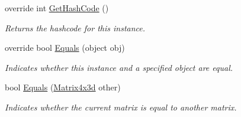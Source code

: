 \begin{DoxyCompactItemize}
override int \hyperlink{struct_open_t_k_1_1_matrix4x3d_a83922cf5625e381e429eae1a51e936cf}{Get\-Hash\-Code} ()
\begin{DoxyCompactList}\small\item\em Returns the hashcode for this instance. \end{DoxyCompactList}\item 
override bool \hyperlink{struct_open_t_k_1_1_matrix4x3d_a55b9d206e190184e1d8be634b15acf7e}{Equals} (object obj)
\begin{DoxyCompactList}\small\item\em Indicates whether this instance and a specified object are equal. \end{DoxyCompactList}\item 
bool \hyperlink{struct_open_t_k_1_1_matrix4x3d_a37bc5320745827c9946a03f767cab875}{Equals} (\hyperlink{struct_open_t_k_1_1_matrix4x3d}{Matrix4x3d} other)
\begin{DoxyCompactList}\small\item\em Indicates whether the current matrix is equal to another matrix.\end{DoxyCompactList}\end{DoxyCompactItemize}
